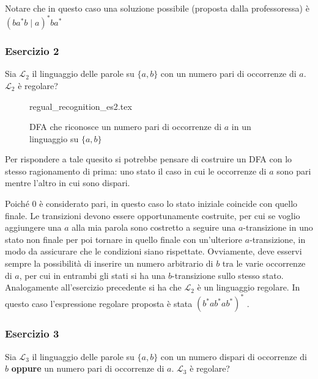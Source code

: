 \documentclass[class=book, crop=false, oneside, 12pt]{standalone}
\begin{document}
\noindent Notare che in questo caso una soluzione possibile (proposta dalla professoressa) è \((b a^*b \mid a)^* ba^*\)

\subsubsection{Esercizio 2}
Sia \(\mathcal{L}_2\) il linguaggio delle parole su \(\{a, b\}\) con un numero pari di occorrenze di \(a\). \(\mathcal{L}_2\) è regolare?
\begin{figure}[H]
    \centering
    {regual_recognition_es2.tex}
    \caption{DFA che riconosce un numero pari di occorrenze di \(a\) in un linguaggio su \(\{a,b\}\)}
    \label{a_pari}
\end{figure}

Per rispondere a tale quesito si potrebbe pensare di costruire un DFA con lo stesso ragionamento di prima: uno stato il caso in cui le occorrenze di \(a\) sono pari mentre l'altro in cui sono dispari.

Poiché \(0\) è considerato pari, in questo caso lo stato iniziale coincide con quello finale. Le transizioni devono essere opportunamente costruite, per cui se voglio aggiungere una \(a\) alla mia parola sono costretto a seguire una \(a\)-transizione in uno stato non finale per poi tornare in quello finale con un'ulteriore \(a\)-transizione, in modo da assicurare che le condizioni siano rispettate. Ovviamente, deve esservi sempre la possibilità di inserire un numero arbitrario di \(b\) tra le varie occorrenze di \(a\), per cui in entrambi gli stati si ha una \(b\)-transizione sullo stesso stato. Analogamente all'esercizio precedente si ha che \(\mathcal{L}_2\) è un linguaggio regolare. In questo caso l'espressione regolare proposta è stata \((b^*ab^*ab^*)^*\) .

\subsubsection{Esercizio 3}  
Sia \(\mathcal{L}_3\) il linguaggio delle parole su \(\{a, b\}\) con un numero dispari di occorrenze di \(b\) \textbf{oppure} un numero pari di occorrenze di \(a\). \(\mathcal{L}_3\) è regolare?
\end{document}
